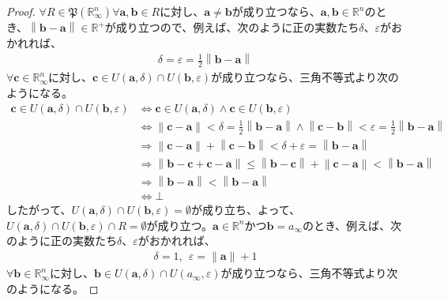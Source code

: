 \documentclass[dvipdfmx]{jsarticle}
\begin{document}
\begin{proof}
$\forall R \in \mathfrak{P}\left( \mathbb{R}_{\infty}^{n} \right)\forall\mathbf{a},\mathbf{b} \in R$に対し、$\mathbf{a} \neq \mathbf{b}$が成り立つなら、$\mathbf{a},\mathbf{b} \in \mathbb{R}^{n}$のとき、$\left\| \mathbf{b} - \mathbf{a} \right\| \in \mathbb{R}^{+}$が成り立つので、例えば、次のように正の実数たち$\delta$、$\varepsilon$がおかれれば、
\begin{align*}
\delta = \varepsilon = \frac{1}{2}\left\| \mathbf{b} - \mathbf{a} \right\|
\end{align*}
$\forall\mathbf{c} \in \mathbb{R}_{\infty}^{n}$に対し、$\mathbf{c} \in U\left( \mathbf{a},\delta \right) \cap U\left( \mathbf{b},\varepsilon \right)$が成り立つなら、三角不等式より次のようになる。
\begin{align*}
\mathbf{c} \in U\left( \mathbf{a},\delta \right) \cap U\left( \mathbf{b},\varepsilon \right) &\Leftrightarrow \mathbf{c} \in U\left( \mathbf{a},\delta \right) \land \mathbf{c} \in U\left( \mathbf{b},\varepsilon \right)\\
&\Leftrightarrow \left\| \mathbf{c} - \mathbf{a} \right\| < \delta = \frac{1}{2}\left\| \mathbf{b} - \mathbf{a} \right\| \land \left\| \mathbf{c} - \mathbf{b} \right\| < \varepsilon = \frac{1}{2}\left\| \mathbf{b} - \mathbf{a} \right\|\\
&\Rightarrow \left\| \mathbf{c} - \mathbf{a} \right\| + \left\| \mathbf{c} - \mathbf{b} \right\| < \delta + \varepsilon = \left\| \mathbf{b} - \mathbf{a} \right\|\\
&\Rightarrow \left\| \mathbf{b} - \mathbf{c} + \mathbf{c} - \mathbf{a} \right\| \leq \left\| \mathbf{b} - \mathbf{c} \right\| + \left\| \mathbf{c} - \mathbf{a} \right\| < \left\| \mathbf{b} - \mathbf{a} \right\|\\
&\Rightarrow \left\| \mathbf{b} - \mathbf{a} \right\| < \left\| \mathbf{b} - \mathbf{a} \right\|\\
&\Leftrightarrow \bot
\end{align*}
したがって、$U\left( \mathbf{a},\delta \right) \cap U\left( \mathbf{b},\varepsilon \right) = \emptyset$が成り立ち、よって、$U\left( \mathbf{a},\delta \right) \cap U\left( \mathbf{b},\varepsilon \right) \cap R = \emptyset$が成り立つ。$\mathbf{a} \in \mathbb{R}^{n}$かつ$\mathbf{b} = a_{\infty}$のとき、例えば、次のように正の実数たち$\delta$、$\varepsilon$がおかれれば、
\begin{align*}
\delta = 1,\ \ \varepsilon = \left\| \mathbf{a} \right\| + 1
\end{align*}
$\forall\mathbf{b} \in \mathbb{R}_{\infty}^{n}$に対し、$\mathbf{b} \in U\left( \mathbf{a},\delta \right) \cap U\left( a_{\infty},\varepsilon \right)$が成り立つなら、三角不等式より次のようになる。

\end{proof}
\end{document}
